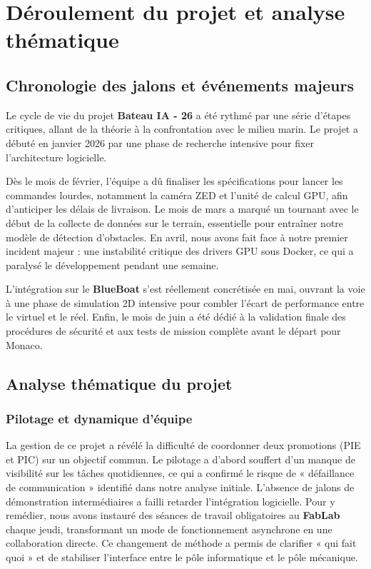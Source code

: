 \documentclass[11pt, a4paper]{article}
\begin{document}
\section{Déroulement du projet et analyse thématique}

\subsection{Chronologie des jalons et événements majeurs}
Le cycle de vie du projet \textbf{Bateau IA - 26} a été rythmé par une série d'étapes critiques, allant de la théorie à la confrontation avec le milieu marin. Le projet a débuté en janvier 2026 par une phase de recherche intensive pour fixer l'architecture logicielle.

Dès le mois de février, l'équipe a dû finaliser les spécifications pour lancer les commandes lourdes, notamment la caméra ZED et l'unité de calcul GPU, afin d'anticiper les délais de livraison. Le mois de mars a marqué un tournant avec le début de la collecte de données sur le terrain, essentielle pour entraîner notre modèle de détection d'obstacles. En avril, nous avons fait face à notre premier incident majeur : une instabilité critique des drivers GPU sous Docker, ce qui a paralysé le développement pendant une semaine.

L'intégration sur le \textbf{BlueBoat} s'est réellement concrétisée en mai, ouvrant la voie à une phase de simulation 2D intensive pour combler l'écart de performance entre le virtuel et le réel. Enfin, le mois de juin a été dédié à la validation finale des procédures de sécurité et aux tests de mission complète avant le départ pour Monaco.

\subsection{Analyse thématique du projet}

\subsubsection{Pilotage et dynamique d'équipe}
La gestion de ce projet a révélé la difficulté de coordonner deux promotions (PIE et PIC) sur un objectif commun. Le pilotage a d'abord souffert d'un manque de visibilité sur les tâches quotidiennes, ce qui a confirmé le risque de « défaillance de communication » identifié dans notre analyse initiale. L'absence de jalons de démonstration intermédiaires a failli retarder l'intégration logicielle. Pour y remédier, nous avons instauré des séances de travail obligatoires au \textbf{FabLab} chaque jeudi, transformant un mode de fonctionnement asynchrone en une collaboration directe. Ce changement de méthode a permis de clarifier « qui fait quoi » et de stabiliser l'interface entre le pôle informatique et le pôle mécanique.
\end{document}
